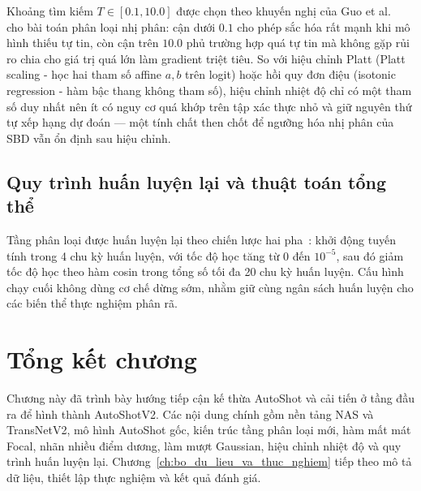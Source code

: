Khoảng tìm kiếm $T \in [0.1, 10.0]$ được chọn theo khuyến nghị của Guo et al.\ \cite{Guo2017Calibration} cho bài toán phân loại nhị phân: cận dưới $0.1$ cho phép sắc hóa rất mạnh khi mô hình thiếu tự tin, còn cận trên $10.0$ phủ trường hợp quá tự tin mà không gặp rủi ro chia cho giá trị quá lớn làm gradient triệt tiêu. So với hiệu chỉnh Platt (Platt scaling - học hai tham số affine $a, b$ trên logit) hoặc hồi quy đơn điệu (isotonic regression - hàm bậc thang không tham số), hiệu chỉnh nhiệt độ chỉ có một tham số duy nhất nên ít có nguy cơ quá khớp trên tập xác thực nhỏ và giữ nguyên thứ tự xếp hạng dự đoán --- một tính chất then chốt để ngưỡng hóa nhị phân của SBD vẫn ổn định sau hiệu chỉnh.

\subsection{Quy trình huấn luyện lại và thuật toán tổng thể}
\label{subsec:v2_training}

Tầng phân loại được huấn luyện lại theo chiến lược hai pha~\cite{Loshchilov2016SGDR}: khởi động tuyến tính trong 4 chu kỳ huấn luyện, với tốc độ học tăng từ 0 đến $10^{-5}$, sau đó giảm tốc độ học theo hàm cosin trong tổng số tối đa 20 chu kỳ huấn luyện. Cấu hình chạy cuối không dùng cơ chế dừng sớm, nhằm giữ cùng ngân sách huấn luyện cho các biến thể thực nghiệm phân rã.

\section{Tổng kết chương}
\label{sec:chap3_conclusion}

Chương này đã trình bày hướng tiếp cận kế thừa AutoShot và cải tiến ở tầng đầu ra để hình thành AutoShotV2. Các nội dung chính gồm nền tảng NAS và TransNetV2, mô hình AutoShot gốc, kiến trúc tầng phân loại mới, hàm mất mát Focal, nhãn nhiều điểm dương, làm mượt Gaussian, hiệu chỉnh nhiệt độ và quy trình huấn luyện lại. Chương~\ref{ch:bo_du_lieu_va_thuc_nghiem} tiếp theo mô tả dữ liệu, thiết lập thực nghiệm và kết quả đánh giá.
